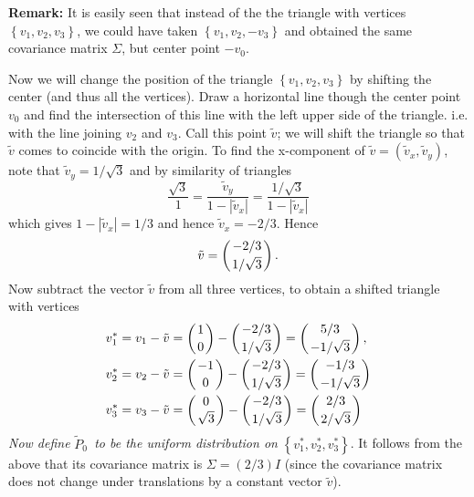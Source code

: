 \documentclass[11pt,twoside]{article}%
\theoremstyle{change}
\begin{document}
\textbf{Remark: }It is easily seen that instead of the the triangle with
vertices $\left\{  v_{1},v_{2},v_{3}\right\}  $, we could have taken $\left\{
v_{1},v_{2},-v_{3}\right\}  $ and obtained the same covariance matrix $\Sigma
$, but center point $-v_{0}$.

Now we will change the position of the triangle $\left\{  v_{1},v_{2}%
,v_{3}\right\}  $ by shifting the center (and thus all the vertices). Draw a
horizontal line though the center point $v_{0}$ and find the intersection of
this line with the left upper side of the triangle. i.e. with the line joining
$v_{2}$ and $v_{3}$. Call this point $\tilde{v}$; we will shift the triangle
so that $\tilde{v}$ comes to coincide with the origin. To find the x-component
of $\tilde{v}=\left(  \tilde{v}_{x},\tilde{v}_{y}\right)  $, note that
$\tilde{v}_{y}=1/\sqrt{3}$ and by similarity of triangles%
\[
\frac{\sqrt{3}}{1}=\frac{\tilde{v}_{y}}{1-\left\vert \tilde{v}_{x}\right\vert
}=\frac{1/\sqrt{3}}{1-\left\vert \tilde{v}_{x}\right\vert }%
\]
which gives $1-\left\vert \tilde{v}_{x}\right\vert =1/3$ and hence $\tilde
{v}_{x}=-2/3$. Hence
\[
\tilde{v}=\left(
\genfrac{}{}{0pt}{}{-2/3}{1/\sqrt{3}}%
\right)  .
\]
Now subtract the vector $\tilde{v}$ from all three vertices, to obtain a
shifted triangle with vertices
\begin{align*}
v_{1}^{\ast}  & =v_{1}-\tilde{v}=\left(
\genfrac{}{}{0pt}{}{1}{0}%
\right)  -\left(
\genfrac{}{}{0pt}{}{-2/3}{1/\sqrt{3}}%
\right)  =\left(
\genfrac{}{}{0pt}{}{5/3}{-1/\sqrt{3}}%
\right)  ,\\
v_{2}^{\ast}  & =v_{2}-\tilde{v}=\left(
\genfrac{}{}{0pt}{}{-1}{0}%
\right)  -\left(
\genfrac{}{}{0pt}{}{-2/3}{1/\sqrt{3}}%
\right)  =\left(
\genfrac{}{}{0pt}{}{-1/3}{-1/\sqrt{3}}%
\right) \\
v_{3}^{\ast}  & =v_{3}-\tilde{v}=\left(
\genfrac{}{}{0pt}{}{0}{\sqrt{3}}%
\right)  -\left(
\genfrac{}{}{0pt}{}{-2/3}{1/\sqrt{3}}%
\right)  =\left(
\genfrac{}{}{0pt}{}{2/3}{2/\sqrt{3}}%
\right)
\end{align*}
\textit{Now define }$\tilde{P}_{0}$\textit{\ to be the uniform distribution on
}$\left\{  v_{1}^{\ast},v_{2}^{\ast},v_{3}^{\ast}\right\}  $. It follows from
the above that its covariance matrix is $\Sigma=(2/3)I$ (since the covariance
matrix does not change under translations by a constant vector $\tilde{v}$).
\end{document}
